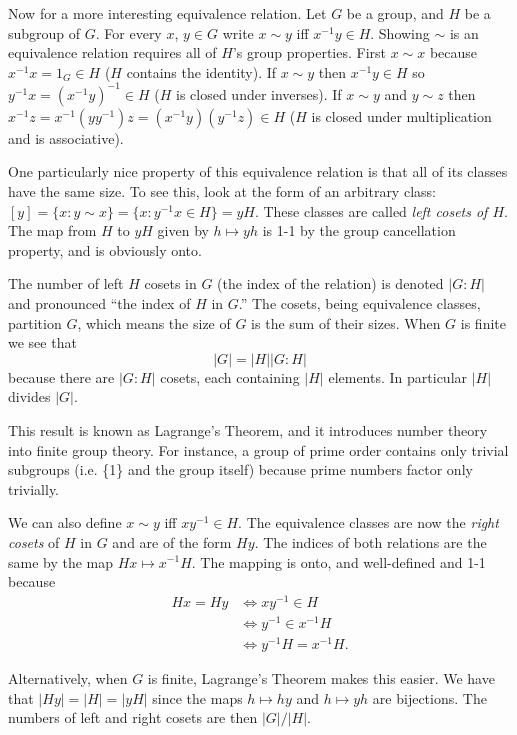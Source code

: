 \documentclass[letterpaper]{article}
\begin{document}
Now for a more interesting equivalence relation. Let $G$ be a group,
and $H$ be a subgroup of $G$. For every $x$, $y \in G$ write $x
\sim y$ iff $x^{-1}y \in H$. Showing $\sim$ is an equivalence
relation requires all of $H$'s group properties. First $x \sim x$
because $x^{-1}x = 1_G \in H$ ($H$ contains the identity). If $x
\sim y$ then $x^{-1}y \in H$ so $y^{-1}x = (x^{-1}y)^{-1} \in H$
($H$ is closed under inverses). If $x \sim y$ and $y \sim z$ then
$x^{-1}z = x^{-1}(yy^{-1})z = (x^{-1}y)(y^{-1}z) \in H$ ($H$ is
closed under multiplication and is associative).

One particularly nice property of this equivalence relation is that
all of its classes have the same size. To see this, look at the
form of an arbitrary class: $\left[y\right] = \{x: y \sim x\} =
\{x: y^{-1}x \in H\} = yH$. These classes are called \emph{left
cosets of $H$}. The map from $H$ to $yH$ given by $h \mapsto yh$
is 1-1 by the group cancellation property, and is obviously onto.

The number of left $H$ cosets in $G$ (the index of the relation)
is denoted $|G : H|$ and pronounced ``the index of $H$ in $G$.''
The cosets, being equivalence classes, partition $G$, which means
the size of $G$ is the sum of their sizes.  When $G$ is finite we
see that \[|G| = |H||G : H|\] because there are $|G : H|$ cosets,
each containing $|H|$ elements. In particular $|H|$ divides $|G|$.

This result is known as Lagrange's Theorem, and it introduces number
theory into finite group theory. For instance, a group of prime
order contains only trivial subgroups (i.e. \{1\} and the group
itself) because prime numbers factor only trivially.

We can also define $x \sim y$ iff $xy^{-1} \in H$. The equivalence
classes are now the \emph{right cosets} of $H$ in $G$ and are of
the form $Hy$.  The indices of both relations are the same by the
map $Hx \mapsto x^{-1}H$. The mapping is onto, and well-defined and
1-1 because
\begin{align*}
Hx = Hy &\Longleftrightarrow xy^{-1} \in H\\
        &\Longleftrightarrow y^{-1} \in x^{-1}H\\
		&\Longleftrightarrow y^{-1}H = x^{-1}H.
\end{align*}

Alternatively, when $G$ is finite, Lagrange's Theorem makes this
easier. We have that $|Hy| = |H| = |yH|$ since the maps $h \mapsto
hy$ and $h \mapsto yh$ are bijections. The numbers of left  and
right cosets are then $|G|/|H|$.
\end{document}
